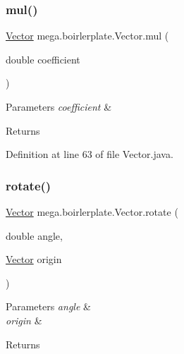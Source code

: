 \mbox{\label{classmega_1_1boirlerplate_1_1_vector_a5493a81c8182359ee340fc987ef2f4e7}} 
\subsubsection{\texorpdfstring{mul()}{mul()}}
{\footnotesize\ttfamily \hyperlink{classmega_1_1boirlerplate_1_1_vector}{Vector} mega.\+boirlerplate.\+Vector.\+mul (\begin{DoxyParamCaption}\item[{double}]{coefficient }\end{DoxyParamCaption})}


\begin{DoxyParams}{Parameters}
{\em coefficient} & \\
\hline
\end{DoxyParams}
\begin{DoxyReturn}{Returns}

\end{DoxyReturn}


Definition at line 63 of file Vector.\+java.

\mbox{\label{classmega_1_1boirlerplate_1_1_vector_a482eca98767170ccd5e4e1cb53f63482}} 
\subsubsection{\texorpdfstring{rotate()}{rotate()}}
{\footnotesize\ttfamily \hyperlink{classmega_1_1boirlerplate_1_1_vector}{Vector} mega.\+boirlerplate.\+Vector.\+rotate (\begin{DoxyParamCaption}\item[{double}]{angle,  }\item[{\hyperlink{classmega_1_1boirlerplate_1_1_vector}{Vector}}]{origin }\end{DoxyParamCaption})}


\begin{DoxyParams}{Parameters}
{\em angle} & \\
\hline
{\em origin} & \\
\hline
\end{DoxyParams}
\begin{DoxyReturn}{Returns}

\end{DoxyReturn}


